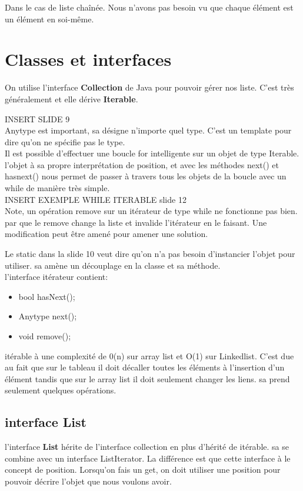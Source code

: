 \documentclass[oneside]{book}
\begin{document}
Dans le cas de liste chaînée. Nous n'avons pas besoin vu que chaque élément est un élément en soi-même. \\

\section{Classes et interfaces}
On utilise l'interface \textbf{Collection} de Java pour pouvoir gérer nos liste. C'est très généralement et elle dérive \textbf{Iterable}. 

INSERT SLIDE 9\\

Anytype est important, sa désigne n'importe quel type. C'est un template pour dire qu'on ne spécifie pas le type.\\

Il est possible d'effectuer une boucle for intelligente sur un objet de type Iterable. l'objet à sa propre interprétation de position, et avec les méthodes next() et hasnext() nous permet de passer à travers tous les objets de la boucle avec un while de manière très simple.\\

INSERT EXEMPLE WHILE ITERABLE slide 12\\

Note, un opération remove sur un itérateur de type while ne fonctionne pas bien. par que le remove change la liste et invalide l'itérateur en le faisant. Une modification peut être amené pour amener une solution.

Le static dans la slide 10 veut dire qu'on n'a pas besoin d'instancier l'objet pour utiliser. sa amène un découplage en la classe et sa méthode.\\

l'interface itérateur contient:
\begin{itemize}
\item bool hasNext();
\item Anytype next();
\item void remove();
\end{itemize}

itérable à une complexité de 0(n) sur array list et O(1) sur Linkedlist. C'est due au fait que sur le tableau il doit décaller toutes les éléments à l'insertion d'un élément tandis que sur le array list il doit seulement changer les liens. sa prend seulement quelques opérations.\\

\subsection{interface List}
l'interface \textbf{List} hérite de l'interface collection en plus d'hérité de itérable. sa se combine avec un interface ListIterator. La différence est que cette interface à le concept de position. Lorsqu'on fais un get, on doit utiliser une position pour pouvoir décrire l'objet que nous voulons avoir. \\
\end{document}

